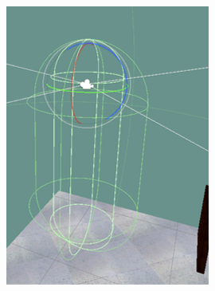         \begin{figure}[!htb]
            \centering
            \begin{minipage}{0.45\textwidth}
                \centering
                \includegraphics[width = 0.8\linewidth]{Metodologia/envelope1.png}
                \label{fig:user_straight}
            \end{minipage}
            \begin{minipage}{0.075\textwidth}
                \hfill
            \end{minipage}
            \begin{minipage}{0.45\textwidth}
                \centering

\end{minipage}
\end{figure}
